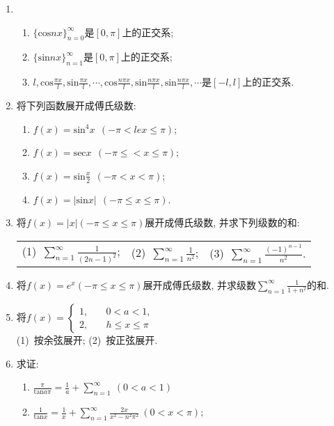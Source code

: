 \begin{enumerate}
	\item 
	\begin{enumerate}
		\item $\{\mathrm{cos}nx\}_{n=0}^{\infty}$是$[0,\pi]$上的正交系;
		\item $\{\mathrm{sin}nx\}_{n=1}^{\infty}$是$[0,\pi]$上的正交系;
		\item$l,\mathrm{cos}\frac{\pi x}{l},\mathrm{sin}\frac{\pi x}{l},\cdots,\mathrm{cos}\frac{n\pi x}{l},\mathrm{sin}\frac{n\pi x}{l},\mathrm{sin}\frac{n\pi x}{l},\cdots$是$[-l,l]$上的正交系.
	\end{enumerate}
\item 将下列函数展开成傅氏级数:
\begin{enumerate}
	\item $f(x)=\mathrm{sin}^4x\ \ (-\pi<le x\le \pi)$;
	\item $f(x)=\mathrm{sec}x\ \ (-\pi\le <x \le \pi)$;
	\item $f(x)=\mathrm{sin}\frac{x}{2}\ \ (-\pi<x<\pi)$;
	\item $f(x)=|\mathrm{sin}x|\ \ (-\pi\le x\le \pi)$.
\end{enumerate}
\item 将$f(x)=|x|(-\pi \le x\le \pi)$展开成傅氏级数, 并求下列级数的和:
\begin{table}[H]
	\begin{tabular}{lll}
		\qquad (1)\ $\sum\limits_{n=1}^{\infty}\frac{1}{(2n-1)^2}$;\qquad \qquad &(2)\ $\sum\limits_{n=1}^{\infty}\frac{1}{n^2}$;\qquad \qquad &(3)\ $\sum\limits_{n=1}^{\infty	}\frac{(-1)^{n-1}}{n^2}$.
	\end{tabular}
\end{table}
\item 将$f(x)=e^x(-\pi\le x\le \pi)$展开成傅氏级数, 并求级数$\sum\limits_{n=1}^{\infty}\frac{1}{1+n^2}$的和.
\item 将$f(x)=\begin{cases}
	1,\quad& 0<a<1,\\
	2,\quad &h\le x\le \pi
	\end{cases}$\\
	(1)\ 按余弦展开;	\qquad \qquad \qquad \qquad(2)\ 按正弦展开.
\item 求证:
\begin{enumerate}
	\item $\frac{\pi}{\mathrm{tan}a\pi}=\frac{1}{a}+\sum\limits_{n=1}^{\infty}\ (0<a<1)$
	\item $\frac{1}{\mathrm{tan}x}=\frac{1}{x}+\sum\limits_{n=1}^{\infty}\frac{2x}{x^2-n^2\pi^2}\ (0<x<\pi)$;

\end{enumerate}
\end{enumerate}
